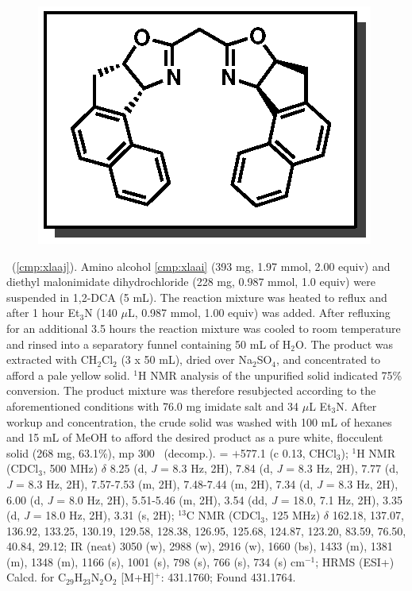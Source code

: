 \vspace{10pt}
\begin{figure}
  \vspace{-30pt}
  \begin{center}
    \includegraphics[scale=0.8]{chp_asymmetric/images/xlaaj}
  \end{center}
  \vspace{-30pt}
\end{figure}
\noindent \textbf{\CMPxlaaj}\ (\ref{cmp:xlaaj}). Amino alcohol
\ref{cmp:xlaai} (393 mg, 1.97 mmol, 2.00 equiv) and diethyl malonimidate
dihydrochloride (228 mg, 0.987 mmol, 1.0 equiv) were suspended in 1,2-DCA (5
mL). The reaction mixture was heated to reflux and after 1 hour Et$_3$N (140
$\mu$L, 0.987 mmol, 1.00 equiv) was added. After refluxing for an additional 3.5
hours the reaction mixture was cooled to room temperature and rinsed into a
separatory funnel containing 50 mL of H$_2$O. The product was extracted with
CH$_2$Cl$_2$ (3 x 50 mL), dried over Na$_2$SO$_4$, and concentrated to afford a
pale yellow solid. $^1$H NMR analysis of the unpurified solid indicated 75\%
conversion. The product mixture was therefore resubjected according to the
aforementioned conditions with 76.0 mg imidate salt and 34 $\mu$L Et$_3$N. After
workup and concentration, the crude solid was washed with 100 mL of hexanes and
15 mL of MeOH to afford the desired product as a pure white, flocculent solid
(268 mg, 63.1\%), mp 300 \degc\  (decomp.).
\rotation = $+$577.1 (c 0.13, CHCl$_3$); $^1$H NMR (CDCl$_3$, 500 MHz) $\delta$
8.25 (d, \textit{J} = 8.3 Hz, 2H), 7.84 (d, \textit{J} = 8.3 Hz, 2H), 7.77 (d, \textit{J} = 8.3 Hz,  2H),
7.57-7.53 (m, 2H), 7.48-7.44 (m, 2H), 7.34 (d, \textit{J} = 8.3 Hz, 2H), 6.00
(d, \textit{J} = 8.0 Hz, 2H), 5.51-5.46 (m, 2H), 3.54 (dd, \textit{J} = 18.0,
7.1 Hz, 2H), 3.35 (d, \textit{J} = 18.0 Hz, 2H), 3.31 (s, 2H); $^{13}$C NMR
(CDCl$_3$, 125 MHz) $\delta$ 162.18, 137.07, 136.92, 133.25, 130.19, 129.58, 128.38, 126.95, 125.68, 124.87, 123.20, 83.59, 76.50,
40.84, 29.12; IR (neat) 3050 (w), 2988 (w), 2916 (w), 1660 (bs), 1433 (m), 1381
(m), 1348 (m), 1166 (s), 1001 (s), 798 (s), 766 (s), 734 (s) cm$^{-1}$; HRMS
(ESI+) Calcd. for C$_{29}$H$_{23}$N$_2$O$_{2}$ [M+H]$^+$:
431.1760; Found 431.1764.  

